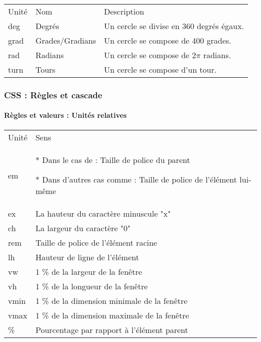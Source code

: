 \documentclass[xcolor=table]{beamer}
\begin{document}
\begin{frame}[fragile]
\begin{center}
	\begin{tabular}{lll}
		\rowcolor{darkblue}
		\color{white}Unité & \color{white}Nom & \color{white}Description \\
		deg & Degrés & Un cercle se divise en 360 degrés égaux. \\
		grad & Grades/Gradians & Un cercle se compose de 400 grades. \\
		rad & Radians & Un cercle se compose de $2\pi$ radians. \\
		turn & Tours & Un cercle se compose d'un tour. \\
	\end{tabular}
\end{center}

\end{frame}

\begin{frame}[fragile]
\frametitle{CSS : Règles et cascade}
\framesubtitle{Règles et valeurs : Unités relatives}

\scriptsize\bfseries
{}

\begin{center}
	\begin{tabular}{p{}p{}}
		\rowcolor{darkblue}
		\color{white}Unité & \color{white}Sens\\
		em & * Dans le cas de \keyword{font-size} : Taille de police du parent 
		
		* Dans d'autres cas comme \keyword{width} : Taille de police  de l'élément lui-même\\
		ex & La hauteur du caractère minuscule "x"\\
		ch & La largeur du caractère "0"\\
		rem & Taille de police de l'élément racine\\
		lh & Hauteur de ligne de l'élément\\
		vw & 1 \% de la largeur de la fenêtre\\
		vh & 1 \% de la longueur de la fenêtre\\
		vmin & 1 \% de la dimension minimale de la fenêtre\\
		vmax & 1 \% de la dimension maximale de la fenêtre\\
		\% & Pourcentage par rapport à l'élément parent\\
	\end{tabular}
\end{center}

\end{frame}
\end{document}
